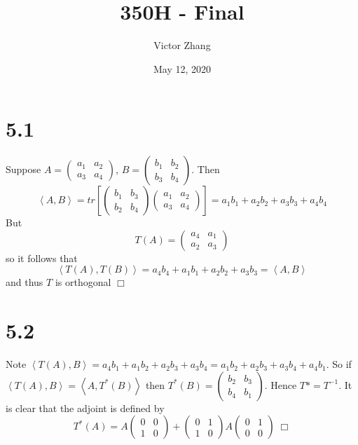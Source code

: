 \documentclass{article}
\title{350H - Final}
\author{Victor Zhang}
\date{May 12, 2020}
\newcommand{\innerprod}[2]{\left\langle #1 , #2 \right\rangle}
\begin{document}
\maketitle

\section*{5.1}
Suppose $A = \left( \begin{matrix} a_1 & a_2 \\ a_3 & a_4 \end{matrix}\right)$, $B = \left( \begin{matrix} b_1 & b_2 \\ b_3 & b_4 \end{matrix}\right)$. Then
$$\innerprod{A}{B} = tr[\left( \begin{matrix} b_1 & b_3 \\ b_2 & b_4 \end{matrix}\right)\left( \begin{matrix} a_1 & a_2 \\ a_3 & a_4 \end{matrix}\right)] = a_1b_1 + a_2b_2 + a_3b_3 + a_4b_4$$
But 
$$T(A) = \left( \begin{matrix} a_4 & a_1 \\ a_2 & a_3 \end{matrix}\right)$$
so it follows that
$$\innerprod{T(A)}{T(B)} = a_4b_4 + a_1b_1 + a_2b_2 + a_3b_3 = \innerprod{A}{B}$$
and thus $T$ is orthogonal $\Box$

\section*{5.2}
Note $\innerprod{T(A)}{B} = a_4b_1 + a_1b_2 + a_2b_3 + a_3b_4 = a_1b_2 + a_2b_3 + a_3b_4 + a_4b_1$. So if $\innerprod{T(A)}{B} = \innerprod{A}{T^*(B)}$ then $T^*(B) = \left( \begin{matrix} b_2 & b_3 \\ b_4 & b_1 \end{matrix}\right)$. Hence $T* = T^{-1}$. It is clear that the adjoint is defined by
$$T^*(A) = A\left( \begin{matrix} 0 & 0 \\ 1 & 0 \end{matrix}\right) + \left( \begin{matrix} 0 & 1 \\ 1 & 0 \end{matrix}\right) A \left( \begin{matrix} 0 & 1 \\ 0 & 0 \end{matrix}\right) \; \Box$$
\end{document}
